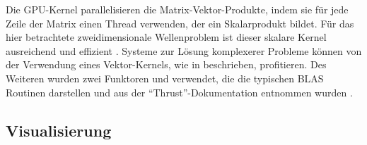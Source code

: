 \documentclass[crop=false,10pt,ngerman]{standalone}
\begin{document}

      Die GPU-Kernel parallelisieren die Matrix-Vektor-Produkte, indem sie für jede Zeile der Matrix einen Thread verwenden, der ein Skalarprodukt bildet.
      Für das hier betrachtete zweidimensionale Wellenproblem ist dieser skalare Kernel ausreichend und effizient \cite{Bell2008,Bell2009}.
      Systeme zur Lösung komplexerer Probleme können von der Verwendung eines Vektor-Kernels, wie in \cite{Bell2008} beschrieben, profitieren.
      Des Weiteren wurden zwei Funktoren  und  verwendet, die die typischen BLAS Routinen darstellen und aus der \enquote{Thrust}-Dokumentation entnommen wurden \cite{cuda2018}.


    \subsection{Visualisierung} %
    \label{sub:visualisierung}
\end{document}
